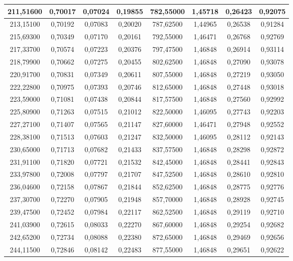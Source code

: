 \documentclass[a4paper,12pt]{article}
\numberwithin{equation}{section}
\begin{document}
\begin{appendices}
\begin{longtable}[c]{|c|c|c|c|c|c|c|c|}
211,51600	&	0,70017	&	0,07024	&	0,19855	&	782,55000	&	1,45718	&	0,26423	&	0,92075	\\\hline
213,15100	&	0,70192	&	0,07083	&	0,20020	&	787,62500	&	1,44965	&	0,26538	&	0,91284	\\\hline
215,69300	&	0,70349	&	0,07170	&	0,20161	&	792,55000	&	1,46471	&	0,26768	&	0,92769	\\\hline
217,33700	&	0,70574	&	0,07223	&	0,20376	&	797,47500	&	1,46848	&	0,26914	&	0,93114	\\\hline
218,79900	&	0,70662	&	0,07275	&	0,20455	&	802,62500	&	1,46848	&	0,27090	&	0,93078	\\\hline
220,91700	&	0,70831	&	0,07349	&	0,20611	&	807,55000	&	1,46848	&	0,27219	&	0,93050	\\\hline
222,22800	&	0,70975	&	0,07393	&	0,20746	&	812,65000	&	1,46848	&	0,27448	&	0,93018	\\\hline
223,59000	&	0,71081	&	0,07438	&	0,20844	&	817,57500	&	1,46848	&	0,27560	&	0,92992	\\\hline
225,80900	&	0,71263	&	0,07515	&	0,21012	&	822,50000	&	1,46095	&	0,27743	&	0,92203	\\\hline
227,27100	&	0,71407	&	0,07565	&	0,21147	&	827,60000	&	1,46471	&	0,27948	&	0,92552	\\\hline
228,38100	&	0,71513	&	0,07603	&	0,21247	&	832,50000	&	1,46095	&	0,28112	&	0,92143	\\\hline
230,65000	&	0,71713	&	0,07682	&	0,21433	&	837,57500	&	1,46848	&	0,28298	&	0,92872	\\\hline
231,91100	&	0,71820	&	0,07721	&	0,21532	&	842,45000	&	1,46848	&	0,28441	&	0,92843	\\\hline
233,97800	&	0,72008	&	0,07797	&	0,21707	&	847,52500	&	1,46848	&	0,28610	&	0,92810	\\\hline
236,04600	&	0,72158	&	0,07867	&	0,21844	&	852,62500	&	1,46848	&	0,28775	&	0,92776	\\\hline
237,30700	&	0,72270	&	0,07905	&	0,21948	&	857,70000	&	1,46848	&	0,28928	&	0,92745	\\\hline
239,47500	&	0,72452	&	0,07984	&	0,22117	&	862,52500	&	1,46848	&	0,29119	&	0,92710	\\\hline
241,03900	&	0,72615	&	0,08033	&	0,22270	&	867,60000	&	1,46848	&	0,29254	&	0,92682	\\\hline
242,65200	&	0,72734	&	0,08088	&	0,22380	&	872,65000	&	1,46848	&	0,29469	&	0,92656	\\\hline
244,11500	&	0,72846	&	0,08142	&	0,22483	&	877,55000	&	1,46848	&	0,29651	&	0,92622	\\\hline

\end{longtable}
\end{appendices}
\end{document}
